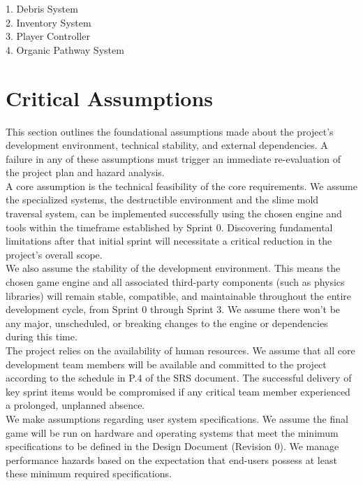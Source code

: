 \documentclass{article}
\begin{document}
1. Debris System\\

2. Inventory System\\

3. Player Controller\\

4. Organic Pathway System\\


\section{Critical Assumptions}

This section outlines the foundational assumptions made about the project's development environment, technical stability, and external dependencies. A failure in any of these assumptions must trigger an immediate re-evaluation of the project plan and hazard analysis.\\

A core assumption is the technical feasibility of the core requirements. We assume the specialized systems, the destructible environment and the slime mold traversal system, can be implemented successfully using the chosen engine and tools within the timeframe established by Sprint 0. Discovering fundamental limitations after that initial sprint will necessitate a critical reduction in the project's overall scope.\\

We also assume the stability of the development environment. This means the chosen game engine and all associated third-party components (such as physics libraries) will remain stable, compatible, and maintainable throughout the entire development cycle, from Sprint 0 through Sprint 3. We assume there won't be any major, unscheduled, or breaking changes to the engine or dependencies during this time.\\

The project relies on the availability of human resources. We assume that all core development team members will be available and committed to the project according to the schedule in P.4 of the SRS document. The successful delivery of key sprint items would be compromised if any critical team member experienced a prolonged, unplanned absence.\\

We make assumptions regarding user system specifications. We assume the final game will be run on hardware and operating systems that meet the minimum specifications to be defined in the Design Document (Revision 0). We manage performance hazards based on the expectation that end-users possess at least these minimum required specifications.\\
\end{document}
